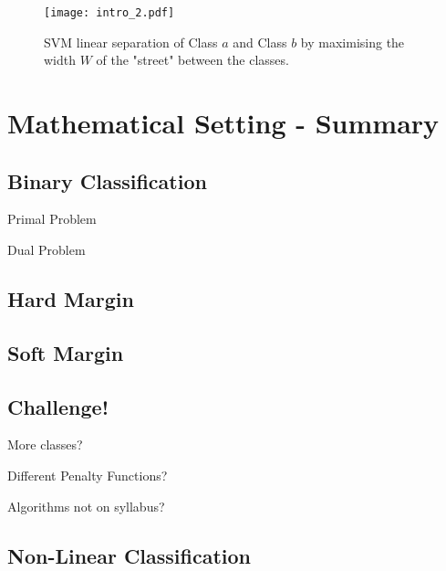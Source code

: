 \documentclass[10pt, a4paper]{amsart}
\begin{document}
\begin{figure}
	\centering	
	\texttt{[image: intro\_2.pdf]}
	\caption{SVM linear separation of Class $a$ and Class $b$ by maximising the width $W$ of the "street" between the classes.}
\end{figure}




\section{Mathematical Setting - Summary}

\subsection{Binary Classification}\hfill

Primal Problem


%

Dual Problem

\subsection{Hard Margin}

\subsection{Soft Margin}

\subsection{Challenge!}\hfill

More classes?

Different Penalty Functions?

Algorithms not on syllabus?

\subsection{Non-Linear Classification}\hfill
\end{document}
